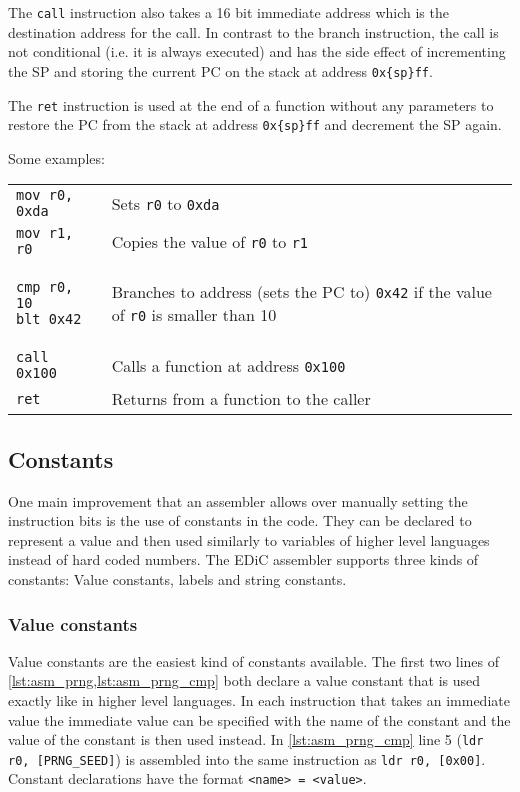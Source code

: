 The \texttt{call} instruction also takes a 16 bit immediate address which is the destination address for the call.
In contrast to the branch instruction, the call is not conditional (i.e. it is always executed) and has the side effect of incrementing the \gls{SP} and storing the current \gls{PC} on the stack at address \texttt{0x\{sp\}ff}.

The \texttt{ret} instruction is used at the end of a function without any parameters to restore the \gls{PC} from the stack at address \texttt{0x\{sp\}ff} and decrement the \gls{SP} again.

Some examples:

\begin{tabular}{m{}m{}}
  \texttt{mov r0, 0xda} & Sets \texttt{r0} to \texttt{0xda}                                                                       \\
  \texttt{mov r1, r0}   & Copies the value of \texttt{r0} to \texttt{r1}                                                          \\
  \begin{verbatim}
cmp r0, 10
blt 0x42
  \end{verbatim}
                                 & Branches to address (sets the \gls{PC} to) \texttt{0x42} if the value of \texttt{r0} is smaller than 10 \\
  \texttt{call 0x100}   & Calls a function at address \texttt{0x100}                                                              \\
  \texttt{ret}          & Returns from a function to the caller
\end{tabular}

\subsection{Constants}\label{sec:constants}
One main improvement that an assembler allows over manually setting the instruction bits is the use of constants in the code.
They can be declared to represent a value and then used similarly to variables of higher level languages instead of hard coded numbers.
The \gls{EDiC} assembler supports three kinds of constants: Value constants, labels and string constants.
\subsubsection{Value constants}\label{sec:vconstants}
Value constants are the easiest kind of constants available.
The first two lines of \cref{lst:asm_prng,lst:asm_prng_cmp} both declare a value constant that is used exactly like in higher level languages.
In each instruction that takes an immediate value the immediate value can be specified with the name of the constant and the value of the constant is then used instead.
In \cref{lst:asm_prng_cmp} line 5 (\texttt{ldr r0, [PRNG_SEED]}) is assembled into the same instruction as \texttt{ldr r0, [0x00]}.
Constant declarations have the format \texttt{<name> = <value>}.

